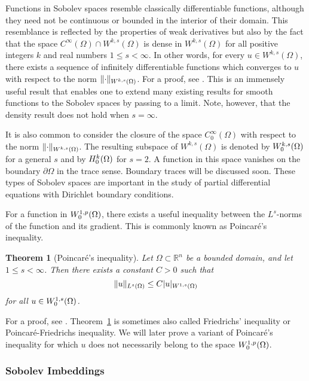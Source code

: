 \documentclass[english, 12pt, a4paper, sci, utf8, a-2b, online]{aaltothesis}
\theoremstyle{definition}
\theoremstyle{plain}
\newtheorem{theorem}{Theorem}[section]
\DeclarePairedDelimiter\abs{\lvert}{\rvert}
\DeclarePairedDelimiter\norm{\lVert}{\rVert}
\numberwithin{equation}{section}
\begin{document}
Functions in Sobolev spaces resemble classically differentiable functions,
although they need not be continuous or bounded in the interior of their domain.
This resemblance is reflected by the properties of
weak derivatives but also by the fact that the space
$C^{\infty}(\Omega) \cap W^{k,s}(\Omega)$ is dense in $W^{k,s}(\Omega)$
for all positive integers $k$ and real numbers $1 \leq s < \infty$.
In other words, for every $u \in W^{k,s}(\Omega)$, there exists a sequence
of infinitely differentiable functions which converges to $u$ with respect
to the norm $\norm{\cdot}_{W^{k,s}(\Omega)}$. For a proof, see
\cite[Theorem~3.17 on p.~67]{adams2003}. This is an immensely useful result that
enables one to extend many existing results for smooth functions to the
Sobolev spaces by passing to a limit. Note, however, that the density result
does not hold when $s=\infty$.

It is also common to consider the closure of the space $C_0^{\infty}(\Omega)$
with respect to the norm $\norm{\cdot}_{W^{k,s}(\Omega)}$. The resulting
subspace of $W^{k,s}(\Omega)$ is denoted by $W_{\smash{0}}^{k,s}(\Omega)$ for a general $s$ and
by $H_{\smash{0}}^k(\Omega)$ for $s=2$.
A function in this space vanishes on the boundary $\partial \Omega$
in the trace sense. Boundary traces will be discussed soon.
These types of Sobolev spaces are important in the study of partial differential equations
with Dirichlet boundary conditions.

For a function in $W_{\smash{0}}^{1,p}(\Omega)$, there exists a useful inequality
between the $L^s$-norms of the function and its gradient. This is commonly
known as Poincaré's inequality.
\begin{theorem}[Poincaré's inequality]
    \label{thm:poincare_inequality}
    Let $\Omega \subset \mathbb{R}^n$ be a bounded domain,
    and let $1 \leq s < \infty$.
    Then there exists a constant $C > 0$ such that
    \begin{equation*}
        \norm{u}_{L^s(\Omega)} \leq C \abs{u}_{W^{1,s}(\Omega)}
    \end{equation*}
    for all $u \in W_{\smash{0}}^{1,s}(\Omega)$.
\end{theorem}
For a proof, see \cite[Theorem~6.30 on p.~183]{adams2003}.
Theorem~\ref{thm:poincare_inequality} is sometimes also called
Friedrichs' inequality or Poincaré-Friedrichs inequality.
We will later prove a variant of Poincaré's inequality
for which $u$ does not necessarily belong to the space $W_{\smash{0}}^{1,p}(\Omega)$.

\subsubsection{Sobolev Imbeddings}
\label{subsubsec:sobolevimbeddingtheorem}
\end{document}
